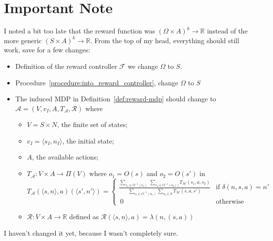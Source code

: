 \section{Important Note}
I noted a bit too late that the reward function was $(\Omega\times A)^k\to\mathbb{R}$ instead of the more generic $(S\times A)^k\to \mathbb{R}$. From the top of my head, everything should still work, save for a few changes: 
\begin{itemize}
	\item Definition of the reward controller $\mathcal{F}$ we change $\Omega$ to $S$.
	\item Procedure~\ref{procedure:into_reward_controller}, change $\Omega$ to $S$
	\item The induced MDP in Definition~\ref{def:reward-mdp} should change to  $\mathcal{A}=(V,v_I,A,T_\mathcal{A},\mathcal{R})$ where 
	\begin{itemize}
		\item $V=S\times N$, the finite set of states;
		\item $v_I=\langle s_I,n_I\rangle $, the initial state;
		\item $A$, the available actions;
		\item $T_\mathcal{A}: V \times A\to \Pi(V)$ where $o_1=O(s)$ and $o_2=O(s')$ in
		\begin{equation*}
			T_\mathcal{A}(\langle s, n\rangle,a)(\langle s',n'\rangle)=
			\begin{cases}
				\frac{\sum\limits_{s_1\in O^{-1}(o_1)}\:\sum\limits_{s_2\in O^{-1}(o_2))}T_{\mathcal{M}}(s_1,a,s_2)}{\sum\limits_{s_1\in O^{-1}(o_1)}\sum\limits_{s_{2}\in S}T_{\mathcal{M}}(s,a,s')} &\text{if } \delta(n,s,a)=n' \\
				\, 0 & \text{otherwise}
			\end{cases}
		\end{equation*}
		\item $\mathcal{R}:V\times A\to\mathbb{R}$ defined as
		$\mathcal{R}(\langle s, n \rangle, a) = \lambda(n,(s,a))$
	\end{itemize}
\end{itemize}

I haven't changed it yet, because I wasn't completely sure. 

